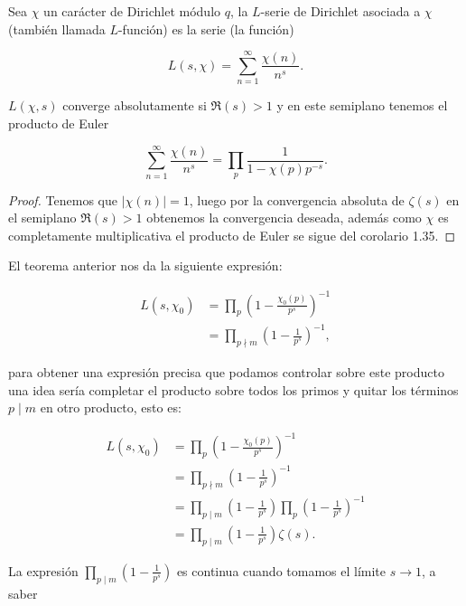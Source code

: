 \begin{definition}
Sea $\chi$ un carácter de Dirichlet módulo $q$, la $L$-serie de Dirichlet asociada a $\chi$ (también llamada $L$-función) es la serie (la función) 

$$
L(s, \chi)=\sum_{n=1}^{\infty} \frac{\chi(n)}{n^s} .
$$

\end{definition}

\begin{theorem}

$L(\chi,s)$ converge absolutamente si $\Re(s)>1$ y en este semiplano tenemos el producto de Euler

$$\sum_{n=1}^{\infty} \frac{\chi(n)}{n^s}=\prod_p \frac{1}{1-\chi(p) p^{-s}}.$$

\end{theorem}

\begin{proof}
Tenemos que $|\chi(n)|=1$, luego por la convergencia absoluta de $\zeta(s)$ en el semiplano $\Re(s)>1$ obtenemos la convergencia deseada, además como $\chi$ es completamente multiplicativa el producto de Euler se sigue del corolario 1.35.
\end{proof}

El teorema anterior nos da la siguiente expresión:

$$\begin{aligned}
L\left(s, \chi_0\right) & =\prod_p\left(1-\frac{\chi_0(p)}{p^s}\right)^{-1} \\
& =\prod_{p \nmid m}\left(1-\frac{1}{p^s}\right)^{-1},
\end{aligned}$$

para obtener una expresión precisa que podamos controlar sobre este producto una idea sería completar el producto sobre todos los primos y quitar los términos $p\mid m$ en otro producto, esto es:

$$
\begin{aligned}
L\left(s, \chi_0\right) & =\prod_p\left(1-\frac{\chi_0(p)}{p^s}\right)^{-1} \\
& =\prod_{p \nmid m}\left(1-\frac{1}{p^s}\right)^{-1} \\
& =\prod_{p \mid m}\left(1-\frac{1}{p^s}\right) \prod_p\left(1-\frac{1}{p^s}\right)^{-1} \\
& =\prod_{p \mid m}\left(1-\frac{1}{p^s}\right) \zeta(s) .
\end{aligned}
$$

La expresión $\displaystyle\prod_{p \mid m}\left(1-\frac{1}{p^s}\right)$ es continua cuando tomamos el límite $s\to 1$, a saber

